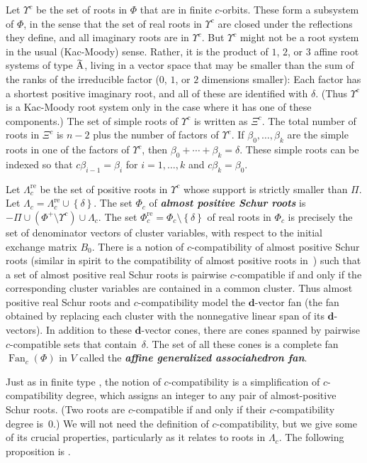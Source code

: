 \documentclass{amsart}
\theoremstyle{definition}
\theoremstyle{remark}
\numberwithin{equation}{section}
\newcommand{\newword}[1]{\textbf{\emph{#1}}}
\newcommand{\set}[1]{{\left\lbrace #1 \right\rbrace}}
\newcommand{\0}{{\mathbf{0}}}
\newcommand{\Fan}{\operatorname{Fan}}
\newcommand{\re}{\mathrm{re}}
\newcommand{\dd}{{\mathbf d}}
\newcommand{\RSChar}{\Phi}
\newcommand{\RS}{\RSChar}
\newcommand{\RSpos}{\RS^+}
\newcommand{\SimplesChar}{\Pi}
\newcommand{\Simples}{\SimplesChar}
\newcommand{\RSTChar}{\Upsilon}
\newcommand{\RST}[1]{\RSTChar^{#1}}
\newcommand{\SimplesTChar}{\Xi}
\newcommand{\SimplesT}[1]{\SimplesTChar^{#1}}
\newcommand{\AP}[1]{\RS_{#1}}
\newcommand{\APre}[1]{\AP{#1}^\re}
\newcommand{\APTChar}{\Lambda}
\newcommand{\APT}[1]{\APTChar_{#1}}
\newcommand{\APTre}[1]{\APT{#1}^\re}
\newcommand{\afftype}[1]{{\widetilde{\raisebox{0pt}[6pt][0pt]{#1}}}}
\begin{document}
Let $\RST{c}$ be the set of roots in $\RS$ that are in finite $c$-orbits.
These form a subsystem of $\RS$, in the sense that the set of real roots in $\RST{c}$ are closed under the reflections they define, and all imaginary roots are in $\RST{c}$.
But $\RST{c}$ might not be a root system in the usual (Kac-Moody) sense.
Rather, it is the product of $1$, $2$, or $3$ affine root systems of type $\afftype{A}$, living in a vector space that may be smaller than the sum of the ranks of the irreducible factor ($0$, $1$, or $2$ dimensions smaller):
Each factor has a shortest positive imaginary root, and all of these are identified with $\delta$.
(Thus $\RST{c}$ is a Kac-Moody root system only in the case where it has one of these components.)
The set of simple roots of $\RST{c}$ is written as $\SimplesT{c}$.
The total number of roots in $\SimplesT{c}$ is $n-2$ plus the number of factors of $\RST{c}$.
If $\beta_0,\ldots,\beta_k$ are the simple roots in one of the factors of $\RST{c}$, then $\beta_0+\cdots+\beta_k=\delta$.
These simple roots can be indexed so that $c\beta_{i-1}=\beta_i$ for $i=1,\ldots,k$ and $c\beta_k=\beta_0$.

Let $\APTre{c}$ be the set of positive roots in $\RST{c}$ whose support is strictly smaller than $\Simples$.
Let $\APT{c}=\APTre{c}\cup\set\delta$.
The set $\AP{c}$ of \newword{almost positive Schur roots} is ${-\Simples\cup(\RSpos\setminus\RST{c})\cup\APT{c}}$.
The set $\APre{c}=\AP{c}\setminus\set\delta$ of real roots in $\AP{c}$ is precisely the set of denominator vectors of cluster variables, with respect to the initial exchange matrix $B_0$.
There is a notion \cite[Definition~4.3]{affdenom} of $c$-compatibility of almost positive Schur roots (similar in spirit to the compatibility of almost positive roots in~\cite{ga}) such that a set of almost positive real Schur roots is pairwise $c$-compatible if and only if the corresponding cluster variables are contained in a common cluster.
Thus almost positive real Schur roots and $c$-compatibility model the $\dd$-vector fan (the fan obtained by replacing each cluster with the nonnegative linear span of its $\dd$-vectors).
In addition to these $\dd$-vector cones, there are cones spanned by pairwise $c$-compatible sets that contain~$\delta$.
The set of all these cones is a complete fan $\Fan_c(\RS)$ in $V$ called the \newword{affine generalized associahedron fan}.

Just as in finite type \cite{ga}, the notion of $c$-compatibility is a simplification of $c$-compatibility degree, which assigns an integer to any pair of almost-positive Schur roots.
(Two roots are $c$-compatible if and only if their $c$-compatibility degree is~$0$.)
We will not need the definition of $c$-compatibility, but we give some of its crucial properties, particularly as it relates to roots in $\APT{c}$.
The following proposition is \cite[Proposition~5.6]{affdenom}.
\end{document}
